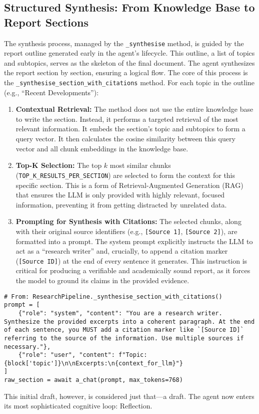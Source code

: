 \documentclass[12pt, a4paper]{article}
\begin{document}
\subsection{Structured Synthesis: From Knowledge Base to Report Sections}
The synthesis process, managed by the \texttt{\_synthesise} method, is guided by the report outline generated early in the agent's lifecycle. This outline, a list of topics and subtopics, serves as the skeleton of the final document. The agent synthesizes the report section by section, ensuring a logical flow.
The core of this process is the \texttt{\_synthesise\_section\_with\_citations} method. For each topic in the outline (e.g., ``Recent Developments''):
\begin{enumerate}
    \item \textbf{Contextual Retrieval:} The method does not use the entire knowledge base to write the section. Instead, it performs a targeted retrieval of the most relevant information. It embeds the section's topic and subtopics to form a query vector. It then calculates the cosine similarity between this query vector and all chunk embeddings in the knowledge base.
    \item \textbf{Top-K Selection:} The top $k$ most similar chunks (\texttt{TOP\_K\_RESULTS\_PER\_SECTION}) are selected to form the context for this specific section. This is a form of Retrieval-Augmented Generation (RAG) that ensures the LLM is only provided with highly relevant, focused information, preventing it from getting distracted by unrelated data.
    \item \textbf{Prompting for Synthesis with Citations:} The selected chunks, along with their original source identifiers (e.g., \texttt{[Source 1]}, \texttt{[Source 2]}), are formatted into a prompt. The system prompt explicitly instructs the LLM to act as a ``research writer'' and, crucially, to append a citation marker (\texttt{[Source ID]}) at the end of every sentence it generates. This instruction is critical for producing a verifiable and academically sound report, as it forces the model to ground its claims in the provided evidence.
\end{enumerate}

\begin{lstlisting}[style=myPython, label={Prompt for initial section synthesis}]
%\begin{Verbatim}[frame=single, label={Prompt for initial section synthesis}]
# From: ResearchPipeline._synthesise_section_with_citations()
prompt = [
    {"role": "system", "content": "You are a research writer. Synthesize the provided excerpts into a coherent paragraph. At the end of each sentence, you MUST add a citation marker like `[Source ID]` referring to the source of the information. Use multiple sources if necessary."},
    {"role": "user", "content": f"Topic: {block['topic']}\n\nExcerpts:\n{context_for_llm}"}
]
raw_section = await a_chat(prompt, max_tokens=768)
\end{lstlisting}
This initial draft, however, is considered just that—a draft. The agent now enters its most sophisticated cognitive loop: Reflection.
\end{document}
